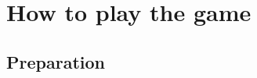 \documentclass[main.tex]{subfiles}
\begin{document}
\section*{How to play the game}


\subsection*{Preparation}
\subsection*{}
\end{document}
